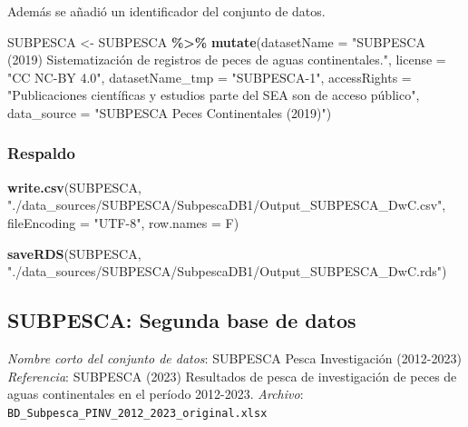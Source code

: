 \documentclass[sn-apa,pdflatex]{sn-jnl}
\newenvironment{Shaded}{\begin{snugshade}}{\end{snugshade}}
\newcommand{\AttributeTok}[1]{\textcolor[rgb]{0.13,0.29,0.53}{#1}}
\newcommand{\FunctionTok}[1]{\textcolor[rgb]{0.13,0.29,0.53}{\textbf{#1}}}
\newcommand{\NormalTok}[1]{#1}
\newcommand{\OtherTok}[1]{\textcolor[rgb]{0.56,0.35,0.01}{#1}}
\newcommand{\SpecialCharTok}[1]{\textcolor[rgb]{0.81,0.36,0.00}{\textbf{#1}}}
\newcommand{\StringTok}[1]{\textcolor[rgb]{0.31,0.60,0.02}{#1}}
\begin{document}
Además se añadió un identificador del conjunto de datos.

\begin{Shaded}
\begin{Highlighting}[]
\NormalTok{SUBPESCA }\OtherTok{\textless{}{-}}\NormalTok{ SUBPESCA }\SpecialCharTok{\%\textgreater{}\%}
    \FunctionTok{mutate}\NormalTok{(}\AttributeTok{datasetName =} \StringTok{"SUBPESCA (2019) Sistematización de registros de peces de aguas continentales."}\NormalTok{,}
        \AttributeTok{license =} \StringTok{"CC NC{-}BY 4.0"}\NormalTok{, }\AttributeTok{datasetName\_tmp =} \StringTok{"SUBPESCA{-}1"}\NormalTok{,}
        \AttributeTok{accessRights =} \StringTok{"Publicaciones científicas y estudios parte del SEA son de acceso público"}\NormalTok{,}
        \AttributeTok{data\_source =} \StringTok{"SUBPESCA Peces Continentales (2019)"}\NormalTok{)}
\end{Highlighting}
\end{Shaded}

\subsubsection{Respaldo}\label{respaldo-4}

\begin{Shaded}
\begin{Highlighting}[]
\FunctionTok{write.csv}\NormalTok{(SUBPESCA, }\StringTok{"./data\_sources/SUBPESCA/SubpescaDB1/Output\_SUBPESCA\_DwC.csv"}\NormalTok{,}
    \AttributeTok{fileEncoding =} \StringTok{"UTF{-}8"}\NormalTok{, }\AttributeTok{row.names =}\NormalTok{ F)}

\FunctionTok{saveRDS}\NormalTok{(SUBPESCA, }\StringTok{"./data\_sources/SUBPESCA/SubpescaDB1/Output\_SUBPESCA\_DwC.rds"}\NormalTok{)}
\end{Highlighting}
\end{Shaded}

\subsection{SUBPESCA: Segunda base de
datos}\label{subpesca-segunda-base-de-datos}

\emph{Nombre corto del conjunto de datos}: SUBPESCA Pesca Investigación
(2012-2023)\\
\emph{Referencia}: SUBPESCA (2023) Resultados de pesca de investigación
de peces de aguas continentales en el período 2012-2023. \emph{Archivo}:
\texttt{BD\_Subpesca\_PINV\_2012\_2023\_original.xlsx}
\end{document}
